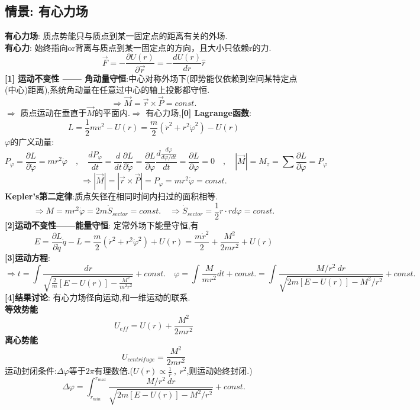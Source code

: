 \documentclass{article}
\begin{document}
\subsection{情景: 有心力场}
\textbf{有心力场}: 质点势能只与质点到某一固定点的距离有关的外场.\\
\textbf{有心力}: 始终指向or背离与质点到某一固定点的方向，且大小只依赖r的力.
$$\vec F = -\frac{\partial U(r)}{\partial \vec r} = -\frac{d U(r)}{d r} \hat r$$
\textbf{[1] 运动不变性 —— 角动量守恒}:中心对称外场下(即势能仅依赖到空间某特定点(中心)距离),系统角动量在任意过中心的轴上投影都守恒.
$$\Rightarrow \vec M = \vec r \times \vec P = const.$$
$\Rightarrow$ 质点运动在垂直于$\vec M$的平面内.\quad $\Rightarrow$ 有心力场,\textbf{[0] Lagrange函数}:
$$L = \frac{1}{2}m v^2 - U(r) = \frac{m}{2} (\dot r^2 + r^2 \dot \varphi ^2) - U(r)$$
$\varphi$的广义动量:
$$P_\varphi = \frac{\partial L}{\partial \dot \varphi} = m r^2 \dot \varphi \quad , \quad \frac{d P_\varphi}{d t} = \frac{d}{d t}\frac{\partial L}{\partial \dot \varphi} = \frac{\partial L}{\partial \varphi} \frac{d \frac{d \varphi}{d \varphi / d t}}{d t} = \frac{\partial L}{\partial \varphi} = 0 \quad , \quad |\vec M| = M_z = \sum \frac{\partial L}{\partial  \dot \varphi} = P_\varphi$$
$$\Rightarrow |\vec M| =| \vec r \times \vec P |= P_\varphi = m r^2 \dot \varphi = const.$$
\textbf{Kepler's第二定律}:质点矢径在相同时间内扫过的面积相等.
$$\Rightarrow M = m r^2 \dot \varphi = 2 m \dot S_{sector} = const.\quad \Rightarrow \dot S_{sector} = \frac{1}{2} r \cdot r d\varphi = const.$$
\textbf{[2]运动不变性——能量守恒}: 定常外场下能量守恒,有
$$E = \frac{\partial L}{\partial \dot q}\dot q - L = \frac{m}{2} (\dot r^2 + r^2 \dot \varphi ^2) + U(r) = \frac{m \dot r^2}{2} + \frac{M^2}{2mr^2} + U(r)$$
\textbf{[3]运动方程}:
$$\Rightarrow t = \int \frac{d r}{\sqrt{\frac{2}{m}[E-U(r)] - \frac{M^2}{m^2 r^2}}} + const. \quad \varphi = \int \frac{M}{m r^2} d t  + const.= \int \frac{M/r^2\ dr}{\sqrt{2m [E-U(r)] - M^2/r^2}} + const.$$
\textbf{[4]结果讨论}: 有心力场径向运动,和一维运动的联系.\\
\textbf{等效势能}
$$U_{eff} = U(r) + \frac{M^2}{2mr^2}$$
\textbf{离心势能}
$$U_{centrifuge} = \frac{M^2}{2mr^2}$$
运动封闭条件:$\Delta \varphi$等于$2\pi$有理数倍.\quad($U(r) \propto \frac{1}{r}\ ,\ r^2$,则运动始终封闭.)
$$\Delta \varphi = \int_{r_{min}} ^{r_{max}} \frac{M/r^2\ dr}{\sqrt{2m [E-U(r)] - M^2/r^2}} + const.$$
\end{document}
